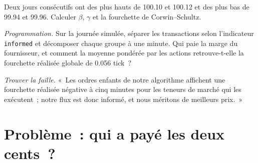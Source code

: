 \begin{exercise}[$\star\star$]\label{exo:mx:decomposing-the-spread:6}
Deux jours consécutifs ont des plus hauts de 100.10 et 100.12 et des plus bas de 99.94 et 99.96. Calculer $\beta$, $\gamma$ et la fourchette de Corwin--Schultz.
\end{exercise}

\begin{exercise}[$\star\star\star$]\label{exo:mx:decomposing-the-spread:7}
\emph{Programmation.} Sur la journée simulée, séparer les transactions selon l'indicateur \texttt{informed} et décomposer chaque groupe à une minute. Qui paie la marge du fournisseur,
et comment la moyenne pondérée par les actions retrouve-t-elle la fourchette réalisée globale de 0.056 tick~?
\end{exercise}

\begin{exercise}[$\star\star\star$]\label{exo:mx:decomposing-the-spread:8}
\emph{Trouver la faille.} «~Les ordres enfants de notre algorithme affichent une fourchette réalisée négative à cinq minutes pour les teneurs de marché qui les exécutent~; notre flux est donc
informé, et nous méritons de meilleurs prix.~»
\end{exercise}

\section{Problème~: qui a payé les deux cents~?}

